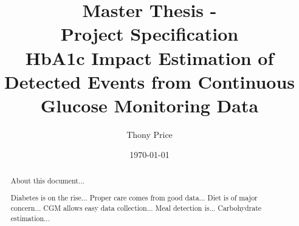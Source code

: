\documentclass{kththesis}
\title{%
    Master Thesis - \\
    Project Specification \\
    \vspace{.5em}
    \large HbA1c Impact Estimation of Detected Events from Continuous Glucose Monitoring Data\\
}
\author{Thony Price}
\date{\today}
\begin{document}
\frontmatter
\titlepage

\begin{abstract}
  About this document...

  Diabetes is on the rise...
  Proper care comes from good data...
  Diet is of major concern...
  CGM allows easy data collection...
  Meal detection is...
  Carbohydrate estimation...
\end{abstract}

\tableofcontents
\mainmatter





\printbibliography[heading=bibintoc]
\end{document}
